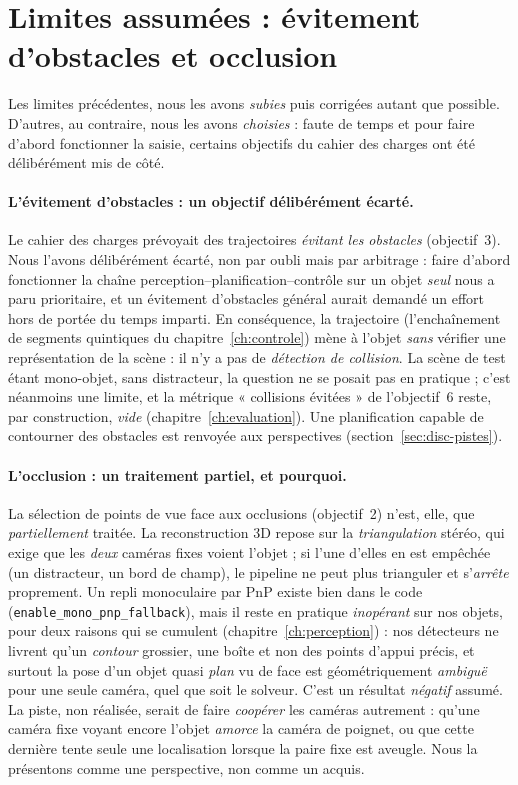 \section{Limites assumées : évitement d'obstacles et occlusion}
\label{sec:disc-assumees}

Les limites précédentes, nous les avons \emph{subies} puis corrigées autant que possible. D'autres, au contraire, nous les avons \emph{choisies} : faute de temps et pour faire d'abord fonctionner la saisie, certains objectifs du cahier des charges ont été délibérément mis de côté.

\paragraph{L'évitement d'obstacles : un objectif délibérément écarté.}
Le cahier des charges prévoyait des trajectoires \emph{évitant les obstacles} (objectif~3). Nous l'avons délibérément écarté, non par oubli mais par arbitrage : faire d'abord fonctionner la chaîne perception--planification--contrôle sur un objet \emph{seul} nous a paru prioritaire, et un évitement d'obstacles général aurait demandé un effort hors de portée du temps imparti. En conséquence, la trajectoire (l'enchaînement de segments quintiques du chapitre~\ref{ch:controle}) mène à l'objet \emph{sans} vérifier une représentation de la scène : il n'y a pas de \emph{détection de collision}. La scène de test étant mono-objet, sans distracteur, la question ne se posait pas en pratique ; c'est néanmoins une limite, et la métrique « collisions évitées » de l'objectif~6 reste, par construction, \emph{vide} (chapitre~\ref{ch:evaluation}). Une planification capable de contourner des obstacles est renvoyée aux perspectives (section~\ref{sec:disc-pistes}).

\paragraph{L'occlusion : un traitement partiel, et pourquoi.}
La sélection de points de vue face aux occlusions (objectif~2) n'est, elle, que \emph{partiellement} traitée. La reconstruction 3D repose sur la \emph{triangulation} stéréo, qui exige que les \emph{deux} caméras fixes voient l'objet ; si l'une d'elles en est empêchée (un distracteur, un bord de champ), le pipeline ne peut plus trianguler et s'\emph{arrête} proprement. Un repli monoculaire par PnP existe bien dans le code (\texttt{enable\_mono\_pnp\_fallback}), mais il reste en pratique \emph{inopérant} sur nos objets, pour deux raisons qui se cumulent (chapitre~\ref{ch:perception}) : nos détecteurs ne livrent qu'un \emph{contour} grossier, une boîte et non des points d'appui précis, et surtout la pose d'un objet quasi \emph{plan} vu de face est géométriquement \emph{ambiguë} pour une seule caméra, quel que soit le solveur. C'est un résultat \emph{négatif} assumé. La piste, non réalisée, serait de faire \emph{coopérer} les caméras autrement : qu'une caméra fixe voyant encore l'objet \emph{amorce} la caméra de poignet, ou que cette dernière tente seule une localisation lorsque la paire fixe est aveugle. Nous la présentons comme une perspective, non comme un acquis.

